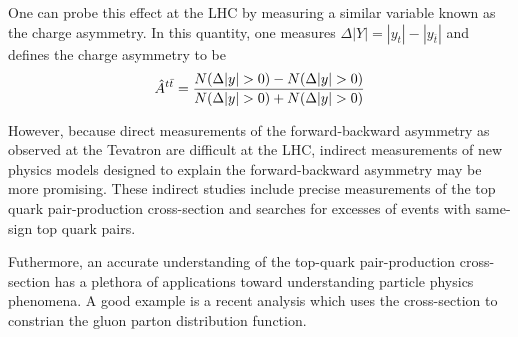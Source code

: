 One can probe this effect at the LHC by measuring a similar variable known as the charge asymmetry.
In this quantity, one measures $\Delta|Y| = |y_t| - |y_{\overline{t}} |$ and defines the charge asymmetry to be
\begin{equation}
  \hat{A}^{\ttbar} = \frac{N(\Delta |y|>0) - N(\Delta |y|>0)}{N(\Delta |y|>0) + N(\Delta |y|>0)}
\end{equation}



However, because direct measurements of the forward-backward asymmetry as observed at the Tevatron are difficult at the LHC, indirect measurements of new physics models designed to explain the forward-backward asymmetry may be more promising.
These indirect studies include precise measurements of the top quark pair-production cross-section and searches for excesses of events with same-sign top quark pairs.



Futhermore, an accurate understanding of the top-quark pair-production cross-section has a plethora of applications toward understanding particle physics phenomena.
A good example is a recent analysis which uses the \ttbar cross-section to constrian the gluon parton distribution function. %
